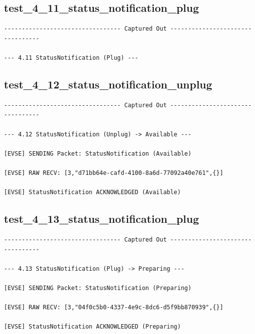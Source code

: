 \documentclass{article}
\begin{document}
\subsection*{test\_4\_11\_status\_notification\_plug}
\begin{lstlisting}
--------------------------------- Captured Out ---------------------------------

--- 4.11 StatusNotification (Plug) ---
\end{lstlisting}
\subsection*{test\_4\_12\_status\_notification\_unplug}
\begin{lstlisting}
--------------------------------- Captured Out ---------------------------------

--- 4.12 StatusNotification (Unplug) -> Available ---

[EVSE] SENDING Packet: StatusNotification (Available)

[EVSE] RAW RECV: [3,"d71bb64e-cafd-4100-8a6d-77092a40e761",{}]

[EVSE] StatusNotification ACKNOWLEDGED (Available)
\end{lstlisting}
\subsection*{test\_4\_13\_status\_notification\_plug}
\begin{lstlisting}
--------------------------------- Captured Out ---------------------------------

--- 4.13 StatusNotification (Plug) -> Preparing ---

[EVSE] SENDING Packet: StatusNotification (Preparing)

[EVSE] RAW RECV: [3,"04f0c5b0-4337-4e9c-8dc6-d5f9bb870939",{}]

[EVSE] StatusNotification ACKNOWLEDGED (Preparing)
\end{lstlisting}
\end{document}

